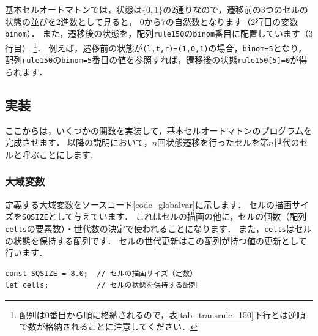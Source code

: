 \documentclass[dvipdfmx]{jsarticle}
\theoremstyle{definition}
\begin{document}
基本セルオートマトンでは，状態は$\{0,1\}$の2通りなので，遷移前の3つのセルの状態の並びを2進数として見ると，
0から7の自然数となります（2行目の変数\verb|binom|）．
また，遷移後の状態を，配列\verb|rule150|の\verb|binom|番目に配置しています（3行目）
\footnote{
    配列は0番目から順に格納されるので，表\ref{tab_transrule_150}下行とは逆順で数が格納されることに注意してください．
}．
%
例えば，遷移前の状態が\verb|(l,t,r)=(1,0,1)|の場合，\verb|binom=5|となり，
配列\verb|rule150|の\verb|binom=5|番目の値を参照すれば，遷移後の状態\verb|rule150[5]=0|が得られます．

\subsection{実装}  \label{subsec_implementation}
ここからは，いくつかの関数を実装して，基本セルオートマトンのプログラムを完成させます．
以降の説明において，$n$回状態遷移を行ったセルを第$n$世代のセルと呼ぶことにします.

\subsubsection{大域変数}  \label{subsubsec_global_var}
定義する大域変数をソースコード\ref{code_globalvar}に示します．
セルの描画サイズを\verb|SQSIZE|として与えています．
これはセルの描画の他に，セルの個数（配列\verb|cells|の要素数）・世代数の決定で使われることになります．
また，\verb|cells|はセルの状態を保持する配列です．
セルの世代更新はこの配列が持つ値の更新として行います．
%
\begin{lstlisting}[caption=大域変数, label=code_globalvar]
const SQSIZE = 8.0;  // セルの描画サイズ（定数）
let cells;           // セルの状態を保持する配列
\end{lstlisting}

\end{document}
